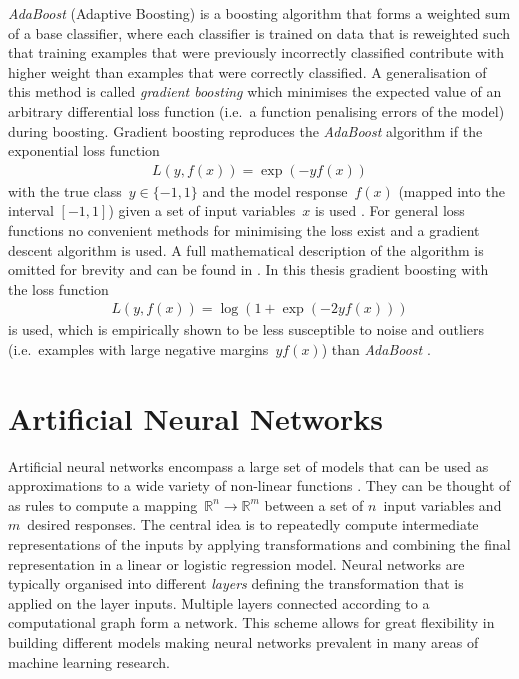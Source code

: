 \emph{AdaBoost} (Adaptive Boosting) is a boosting algorithm that forms a
weighted sum of a base classifier, where each classifier is trained on data that
is reweighted such that training examples that were previously incorrectly
classified contribute with higher weight than examples that were correctly
classified. A generalisation of this method is called \emph{gradient boosting}
which minimises the expected value of an arbitrary differential loss function
(i.e.\ a function penalising errors of the model) during boosting. Gradient
boosting reproduces the \emph{AdaBoost} algorithm if the exponential loss
function
\begin{align*}
  L\left(y, f(x)\right) = \exp\left(- y f(x)\right)
\end{align*}
with the true class~$y \in \{ -1, 1 \}$ and the model response~$f(x)$ (mapped
into the interval $[-1, 1]$) given a set of input variables~$x$ is used
\cite{esl}. For general loss functions no convenient methods for minimising the
loss exist and a gradient descent algorithm is used. A full mathematical
description of the algorithm is omitted for brevity and can be found in
\cite{friedman_gbm, esl}. In this thesis gradient boosting with the loss
function
\begin{align*}
  L\left(y, f(x)\right) = \log\left( 1 + \exp(- 2 y f(x)) \right)
\end{align*}
is used, which is empirically shown to be less susceptible to noise and outliers
(i.e.\ examples with large negative margins~$y f(x)$) than \emph{AdaBoost}
\cite{esl, schapire_boosting}.

\section{Artificial Neural Networks}
\label{sec:nn}

Artificial neural networks encompass a large set of models that can be used as
approximations to a wide variety of non-linear functions \cite{hornik}. They can
be thought of as rules to compute a
mapping~\mbox{$\mathbb{R}^n \rightarrow \mathbb{R}^m$} between a set of
$n$~input variables and $m$~desired responses. The central idea is to repeatedly
compute intermediate representations of the inputs by applying transformations
and combining the final representation in a linear or logistic regression model.
Neural networks are typically organised into different \emph{layers} defining
the transformation that is applied on the layer inputs. Multiple layers
connected according to a computational graph form a network. This scheme allows
for great flexibility in building different models making neural networks
prevalent in many areas of machine learning research.

